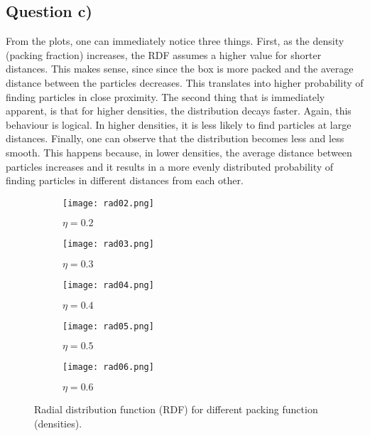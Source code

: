 \documentclass[11pt]{report}
\begin{document}
\subsection*{Question c)}

From the plots, one can immediately notice three things. First, as the density (packing fraction) increases, the RDF assumes a higher value for shorter distances. This makes sense, since since the box is more packed and the average distance between the particles decreases. This translates into higher probability of finding particles in close proximity. The second thing that is immediately apparent, is that for higher densities, the distribution decays faster. Again, this behaviour is logical. In higher densities, it is less likely to find particles at large distances. Finally, one can observe that the distribution becomes less and less smooth. This happens because, in lower densities, the average distance between particles increases and it results in a more evenly distributed probability of finding particles in different distances from each other.

\begin{figure}[ht!]
     \centering
     \begin{subfigure}[b]{0.3\textwidth}
         \centering
         \texttt{[image: rad02.png]}
         \caption{$\eta = 0.2$}
         \label{fig:y equals x}
     \end{subfigure}
     \hfill
     \begin{subfigure}[b]{0.3\textwidth}
         \centering
         \texttt{[image: rad03.png]}
         \caption{$\eta=0.3$}
         \label{fig:three sin x}
     \end{subfigure}
     \hfill
     \begin{subfigure}[b]{0.3\textwidth}
         \centering
         \texttt{[image: rad04.png]}
         \caption{$\eta=0.4$}
         \label{fig:five over x}
     \end{subfigure}
          \begin{subfigure}[b]{0.3\textwidth}
         \centering
         \texttt{[image: rad05.png]}
         \caption{$\eta=0.5$}
         \label{fig:y equals x}
     \end{subfigure}
     \hfill
     \begin{subfigure}[b]{0.3\textwidth}
         \centering
         \texttt{[image: rad06.png]}
         \caption{$\eta=0.6$}
         \label{fig:three sin x}
     \end{subfigure}
        \caption{Radial distribution function (RDF) for different packing function (densities).}
        \label{fig:three graphs}
\end{figure}
\end{document}
